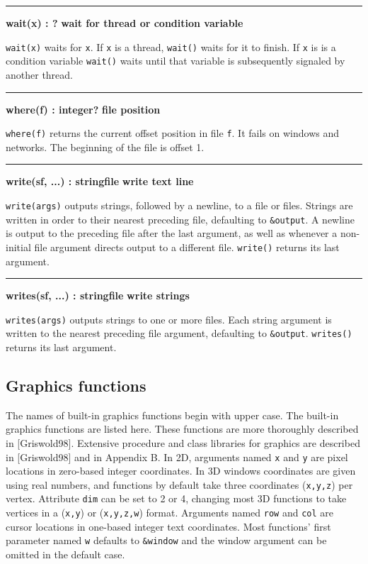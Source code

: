 \bigskip\hrule\vspace{0.1cm}
\noindent
{\bf wait(x) : ? } \hfill {\bf wait for thread or condition variable}

\noindent
{}\texttt{wait(x)} waits for \texttt{x}. If \texttt{x} is
a thread, \texttt{wait()} waits for it to finish. If \texttt{x} is
is a condition variable \texttt{wait()} waits until that variable is
subsequently signaled by another thread.

\bigskip\hrule\vspace{0.1cm}
\noindent
{\bf where(f) : integer? } \hfill {\bf file position}

\noindent
{}\texttt{where(f)} returns the
current offset position in file \texttt{f}. It fails on windows and
networks. The beginning of the file is offset 1.

\bigskip\hrule\vspace{0.1cm}
\noindent
{\bf write(s{\textbar}f, ...) : string{\textbar}file } \hfill {\bf write text line}

\noindent
\texttt{write(args)} outputs strings, followed by a newline, to a file
or files. Strings are written in order to their nearest preceding file,
defaulting to \texttt{\&output}. A newline is output to the preceding
file after the last argument, as well as whenever a non-initial file
argument directs output to a different file.
\texttt{write()} returns its last argument.

\bigskip\hrule\vspace{0.1cm}
\noindent
{\bf writes(s{\textbar}f, ...) : string{\textbar}file } \hfill {\bf write strings}

\noindent
\texttt{writes(args)} outputs strings to one or more files. Each string
argument is written to the nearest preceding file argument, defaulting
to \texttt{\&output}. \texttt{writes()} returns its
last argument.

\subsection*{Graphics functions}

The names of built-in graphics functions begin with upper case. The built-in
graphics functions are listed here. These functions are more thoroughly
described in [Griswold98]. Extensive procedure and class libraries for graphics
are described in [Griswold98] and in Appendix B.  In 2D, arguments named
\texttt{x} and \texttt{y} are pixel locations in zero-based integer
coordinates. In 3D windows coordinates are given using real numbers, and
functions by default take three coordinates (\texttt{x,y,z}) per
vertex. Attribute \texttt{dim} can be set to 2 or 4, changing most 3D functions
to take vertices in a (\texttt{x,y}) or (\texttt{x,y,z,w}) format. Arguments
named \texttt{row} and \texttt{col} are cursor locations in one-based integer
text coordinates. Most functions' first parameter named
\texttt{w} defaults to \texttt{\&window} and the window argument can be omitted
in the default case. 

